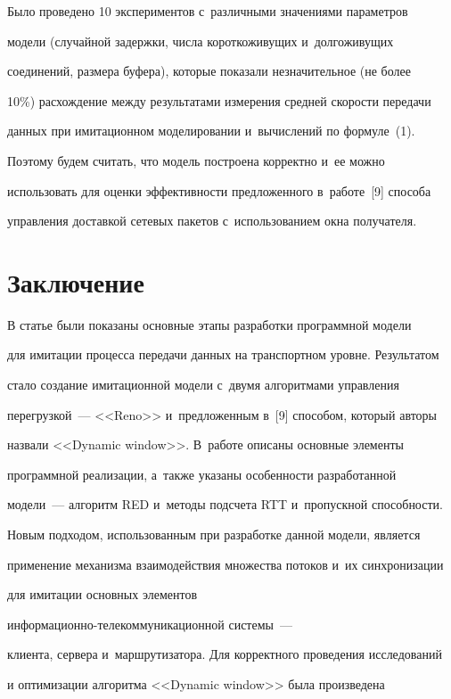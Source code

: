   Было проведено 10 экспериментов с~различными значениями параметров


модели (случайной задержки, числа короткоживущих и~долгоживущих


соединений, размера буфера), которые показали незначительное (не более


10\%) расхождение между результатами измерения средней скорости передачи


данных при имитационном моделировании и~вычислений по формуле~(1).


Поэтому будем считать, что модель построена корректно и~ее можно


использовать для оценки эффективности предложенного в~работе~[9] способа


управления доставкой сетевых пакетов с~использованием окна получателя.





\section{Заключение}





  В статье были показаны основные этапы разработки программной модели


для имитации процесса передачи данных на транспортном уровне. Результатом


стало создание имитационной модели с~двумя алгоритмами управления


перегрузкой~--- <<Reno>> и~предложенным в~[9] способом, который авторы


назвали <<Dynamic window>>. В~работе описаны основные элементы


программной реализации, а~также указаны особенности разработанной


модели~--- алгоритм RED и~методы подсчета RTT и~пропускной способности.


Новым подходом, использованным при разработке данной модели, является


применение механизма взаимодействия множества потоков и~их синхронизации


для имитации основных элементов


  ин\-фор\-ма\-ци\-он\-но-те\-ле\-ком\-му\-ни\-ка\-ци\-он\-ной системы~---


клиента, сервера и~маршрутизатора. Для корректного проведения исследований


и оптимизации алгоритма <<Dynamic window>> была произведена


